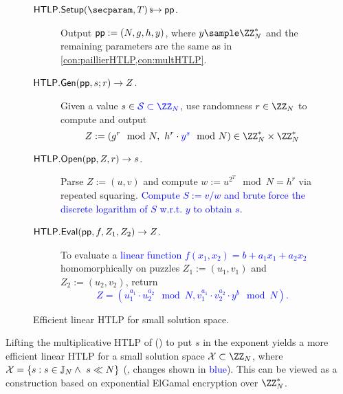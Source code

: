 \renewcommand{\change}[1]{\textcolor{blue}{#1}}
\begin{figure}[tb]
    \centering
    \begin{mdframed}
    \begin{construction}\label{con:exp_elgamalHTLP}
    \hfill
    \begin{description}
        \item[$\htlp.\Setup(\secparam, \Ttime) \randout \pparam$.] Output $\mathsf{pp} := (N, g, h, y)$, where $y \sample \ZZ_N^*$ and the remaining parameters are the same as in \cref{con:paillierHTLP,con:multHTLP}.
        \item[$\mathsf{HTLP}.{\sf Gen}(\mathsf{pp}, s; r) \rightarrow Z$.] Given a value $s \in \change{\mathcal{S} \subset \ZZ_N}$, use randomness $r \in \ZZ_{N}$ to compute and output
            $$Z := (g^r \mod{N},\ h^r \cdot \change{y^s} \mod{N}) \in \ZZ_N^* \times \ZZ_N^*$$
        \item[$\mathsf{HTLP}.\mathsf{Open}(\mathsf{pp}, Z, r) \rightarrow s$.] Parse $Z := (u,v)$ and compute $w := u^{2^T} \mod{N} \allowbreak= h^r$ via repeated squaring. \change{Compute $S := v/w$ and brute force the discrete logarithm of $S$ w.r.t. $y$ to obtain $s$.}
        \item[$\mathsf{HTLP}.{\sf Eval}(\mathsf{pp}, f, Z_1, Z_2) \to Z$.] To evaluate a \change{linear function $f(x_1, x_2) = b + a_1 x_1 + a_2 x_2$} homomorphically on puzzles $Z_1 := (u_1, v_1)$ and $Z_2 := (u_2, v_2)$, return
        \change{$$Z = (u_1^{a_1} \cdot u_2^{a_2} \mod{N}, v_1^{a_1} \cdot v_2^{a_2} \cdot y^b \mod{N}).$$}
    \end{description}
    \end{construction}
    \end{mdframed}
    \caption{Efficient linear HTLP for small solution space.}
    \label{fig:exp_elgamalHTLP}
\end{figure}

Lifting the multiplicative HTLP of \cite{C:MalThy19} () to put $s$ in the exponent yields a more efficient linear HTLP for a small solution space $\X \subset \ZZ_N$, where $\mathcal{X} = \{ s : s \in \mathbb{J}_N \land\ s \ll N \}$ (, changes shown in \change{blue}). This can be viewed as a construction based on exponential ElGamal encryption over $\ZZ_N^*$.


